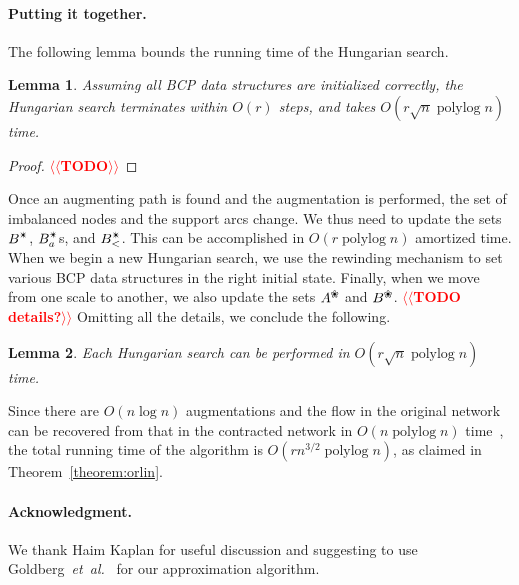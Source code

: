 \documentclass[11pt]{article}
\makeatletter
\def\etal{\emph{et~al.}}
\def\etal{\textit{et~al.}}
\def\polylog{\mathop{\mathrm{polylog}}}
\def\alive#1{{#1}^\text{\ding{96}}}
\def\star{\text{\ding{84}}}
\newtheorem{lemma}{Lemma}[section]
\numberwithin{figure}{section}
\def\n@te#1{\textsf{\boldmath \textbf{$\langle\!\langle$#1$\rangle\!\rangle$}}\leavevmode}
\def\note#1{\textcolor{red}{\n@te{#1}}}
\makeatother
\begin{document}
\paragraph*{Putting it together.}
The following lemma bounds the running time of the Hungarian search.

\begin{lemma}
Assuming all BCP data structures are initialized correctly, the Hungarian search
terminates within $O(r)$ steps, and takes $O(r\sqrt{n}\polylog n)$ time.
\end{lemma}
\begin{proof}
\note{TODO} %
\end{proof}

Once an augmenting path is found and the augmentation is performed, the set of
imbalanced nodes and the support arcs change.
We thus need to update the sets $B^\star$, $B_a^\star$s, and $B_<^\star$.
This can be accomplished in $O(r\polylog n)$ amortized time.
When we begin a new Hungarian search, we use the rewinding mechanism
to set various BCP data structures in the right initial state.
Finally, when we move from one scale to another, we also update the sets
$\alive{A}$ and $\alive{B}$.
\note{TODO details?} %
Omitting all the details, we conclude the following.

\begin{lemma}
Each Hungarian search can be performed in $O(r\sqrt{n}\polylog n)$ time.
\end{lemma}

Since there are $O(n\log n)$ augmentations and the flow in the original network
can be recovered from that in the contracted network in $O(n\polylog n)$
time~\cite{AFPVX17arxiv}, the total running time of the algorithm is
$O(rn^{3/2}\polylog n)$, as claimed in Theorem~\ref{theorem:orlin}.


\paragraph*{Acknowledgment.}
We thank Haim Kaplan for useful discussion and suggesting to use Goldberg~\etal~\cite{GHKT17} for our approximation algorithm.
%
{


}

\appendix
\end{document}
